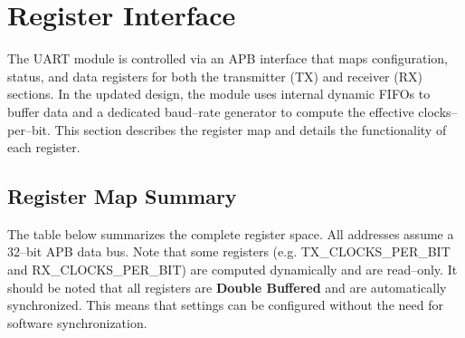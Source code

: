 \section{Register Interface}

The UART module is controlled via an APB interface that maps configuration, status, and data registers for both the transmitter (TX) and receiver (RX) sections. In the updated design, the module uses internal dynamic FIFOs to buffer data and a dedicated baud–rate generator to compute the effective clocks–per–bit. This section describes the register map and details the functionality of each register.

\subsection{Register Map Summary}

The table below summarizes the complete register space. All addresses assume a 32–bit APB data bus. Note that some registers (e.g. TX\_CLOCKS\_PER\_BIT and RX\_CLOCKS\_PER\_BIT) are computed dynamically and are read–only.
It should be noted that all registers are \textbf{Double Buffered} and are automatically synchronized. This means that settings can be configured without the need for software synchronization.


